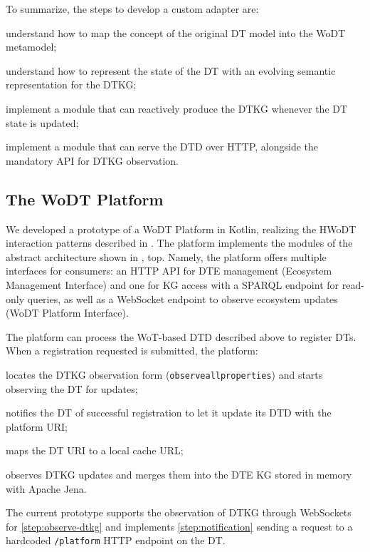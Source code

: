 To summarize, the steps to develop a custom adapter are: 
\begin{inlinelist}
    \item understand how to map the concept of the original \ac{DT} model into the \ac{WoDT} metamodel;
    \item understand how to represent the state of the \ac{DT} with an evolving semantic representation for the \ac{DTKG};
    \item implement a module that can reactively produce the \ac{DTKG} whenever the \ac{DT} state is updated;
    \item implement a module that can serve the \ac{DTD} over HTTP, alongside the mandatory \ac{API} for \ac{DTKG} observation.
\end{inlinelist}

\subsection{The \acs{WoDT} Platform}

We developed a prototype of a \ac{WoDT} Platform in Kotlin, realizing the \ac{HWoDT} interaction patterns described in .
The platform implements the modules of the abstract architecture shown in , top.
%
Namely, the platform offers multiple interfaces for consumers: an HTTP \ac{API} for \ac{DTE} management (Ecosystem Management Interface) and one for \ac{KG} access with a SPARQL endpoint for read-only queries, as well as a WebSocket endpoint to observe ecosystem updates (\ac{WoDT} Platform Interface).

The platform can process the \ac{WoT}-based \ac{DTD} described above to register \acp{DT}.
When a registration requested is submitted, the platform: \begin{inlinelist}
    \item locates the \ac{DTKG} observation form (\texttt{observeallproperties}) and starts observing the \ac{DT} for updates;\label{step:observe-dtkg}
    \item notifies the \ac{DT} of successful registration to let it update its \ac{DTD} with the platform URI;\label{step:notification}
    \item maps the \ac{DT} \ac{URI} to a local cache URL;
    \item observes \ac{DTKG} updates and merges them into the \ac{DTE} \ac{KG} stored in memory with Apache Jena.
\end{inlinelist}
%
The current prototype supports the observation of \ac{DTKG} through WebSockets for \ref{step:observe-dtkg} and implements \ref{step:notification} sending a request to a hardcoded \texttt{/platform} HTTP endpoint on the \ac{DT}.

